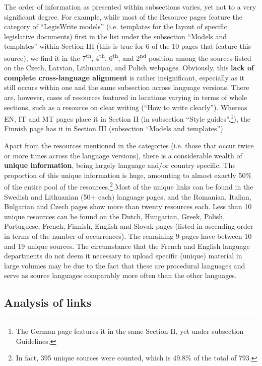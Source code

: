 \documentclass[output=paper]{langsci/langscibook}
\begin{document}
The order of information as presented within subsections varies, yet not to a very significant degree. For example, while most of the Resource pages feature the category of “LegisWrite models” (i.e. templates for the layout of specific  legislative documents) first in the list under the subsection “Models and templates” within Section III (this is true for 6 of the 10 pages that feature this source), we find it in the 7\textsuperscript{th}, 4\textsuperscript{th}, 6\textsuperscript{th}, and 2\textsuperscript{nd} position among the sources listed on the Czech, Latvian, Lithuanian, and Polish webpages. Obviously, this \textbf{lack of complete cross-language alignment} is rather insignificant, especially as it still occurs within one and the same subsection across language versions. There are, however, cases of resources featured in locations varying in terms of whole sections, such as a resource on clear writing (“How to write clearly”). Whereas EN, IT and MT pages place it in Section II (in subsection “Style guides”.\footnote{The German page features it in the same Section II, yet under subsection Guidelines.}), the Finnish page has it in Section III (subsection “Models and templates”)

\largerpage%
Apart from the resources mentioned in the categories (i.e. those that occur twice or more times across the language versions), there is a considerable wealth of \textbf{unique information}, being largely language and/or country specific. The proportion of this unique information is huge, amounting to almost exactly 50\% of the entire pool of the resources.\footnote{In fact, 395 unique sources were counted, which is 49.8\% of the total of 793.} Most of the unique links can be found in the Swedish and Lithuanian (50+ each) language pages, and the Romanian, Italian, Bulgarian and Czech pages show more than twenty resources each. Less than 10 unique resources can be found on the Dutch, Hungarian, Greek, Polish, Portuguese, French, Finnish, English and Slovak pages (listed in ascending order in terms of the number of occurrences). The remaining 9 pages have between 10 and 19 unique sources. The circumstance that the French and English language departments do not deem it necessary to upload specific (unique) material in large volumes may be due to the fact that these are procedural languages and serve as source languages comparably more often than the other languages. 

\subsection{Analysis of links}\label{sec:svoboda:4.4}
\end{document}
